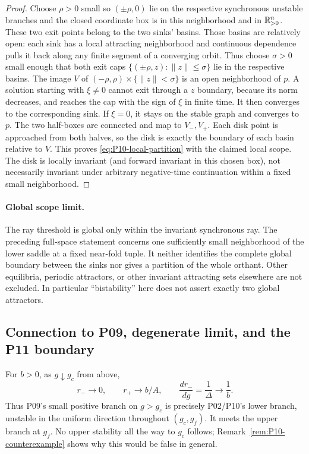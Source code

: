 \begin{proof}
Choose $\rho>0$ small so $(\pm\rho,0)$ lie on the respective
synchronous unstable branches and the closed coordinate box is in
this neighborhood and in $\mathbb{R}_{>0}^{n}$. These two exit points belong
to the two sinks' basins. Those basins are relatively open: each sink
has a local attracting neighborhood and continuous dependence pulls
it back along any finite segment of a converging orbit. Thus choose
$\sigma>0$ small enough that both exit caps
$\{(\pm\rho,z):\|z\|\le\sigma\}$ lie in the respective basins.
The image $V$ of $(-\rho,\rho)\times\{\|z\|<\sigma\}$ is an
open neighborhood of $p$. A solution starting with $\xi\ne0$
cannot exit through a $z$ boundary, because its norm decreases,
and reaches the cap with the sign of $\xi$ in finite time. It then
converges to the corresponding sink. If $\xi=0$, it stays on the
stable graph and converges to $p$. The two half-boxes are connected
and map to $V_-,V_+$. Each disk point is approached from both
halves, so the disk is exactly the boundary of each basin relative
to $V$. This proves \eqref{eq:P10-local-partition} with the claimed
local scope. The disk is locally invariant (and forward invariant
in this chosen box), not necessarily invariant under arbitrary
negative-time continuation within a fixed small neighborhood.
\end{proof}

\paragraph{Global scope limit.}
The ray threshold is global only within the invariant synchronous ray.
The preceding full-space statement concerns one sufficiently small
neighborhood of the lower saddle at a fixed near-fold tuple. It neither
identifies the complete global boundary between the sinks nor gives a
partition of the whole orthant. Other equilibria, periodic attractors,
or other invariant attracting sets elsewhere are not excluded. In
particular ``bistability'' here does not assert exactly two global attractors.

\subsection{Connection to P09, degenerate limit, and the P11 boundary}

For $b>0$, as $g\downarrow g_c$ from above,
\begin{equation}
 r_-\longrightarrow0,\qquad r_+\longrightarrow b/A,
 \qquad \frac{dr_-}{dg}=\frac1\Delta\longrightarrow\frac1b.
 \label{eq:P10-transcritical-connection}
\end{equation}
Thus P09's small positive branch on $g>g_c$ is precisely P02/P10's
lower branch, unstable in the uniform direction throughout
$(g_c,g_f)$. It meets the upper branch at $g_f$. No upper stability
all the way to $g_c$ follows; Remark~\ref{rem:P10-counterexample}
shows why this would be false in general.


